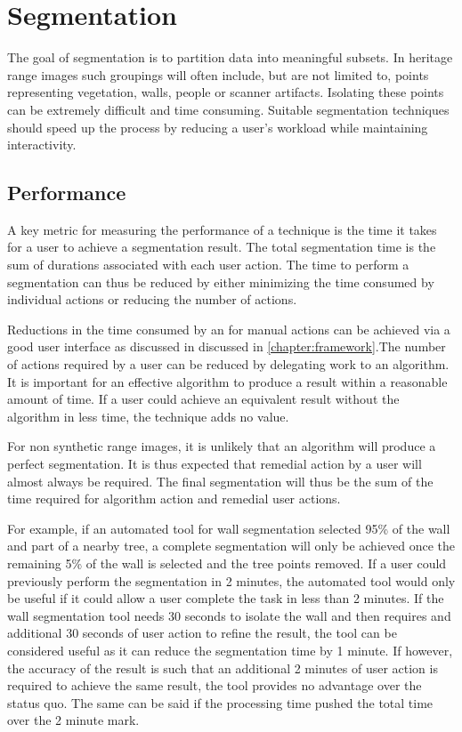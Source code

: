 \chapter{Segmentation}
The goal of segmentation is to partition data into meaningful subsets. In heritage range images such groupings will often include, but are not limited to, points representing vegetation, walls, people or scanner artifacts. Isolating these points can be extremely difficult and time consuming. Suitable segmentation techniques should speed up the process by reducing a user's workload while maintaining interactivity.


\section{Performance}
A key metric for measuring the performance of a technique is the time it takes for a user to achieve a segmentation result. The total segmentation time is the sum of durations associated with each user action. The time to perform a segmentation can thus be reduced by either minimizing the time consumed by individual actions or reducing the number of actions.

Reductions in the time consumed by an for manual actions can be achieved via a good user interface as discussed in discussed in \ref{chapter:framework}.The number of actions required by a user can be reduced by delegating work to an algorithm. It is important for an effective algorithm to produce a result within a reasonable amount of time. If a user could achieve an equivalent result without the algorithm in less time, the technique adds no value.

For non synthetic range images, it is unlikely that an algorithm will produce a perfect segmentation. It is thus expected that remedial action by a user will almost always be required. The final segmentation will thus be the sum of the time required for algorithm action and remedial user actions.

For example, if an automated tool for wall segmentation selected 95\% of the wall and part of a nearby tree, a complete segmentation will only be achieved once the remaining 5\% of the wall is selected and the tree points removed. If a user could previously perform the segmentation in 2 minutes, the automated tool would only be useful if it could allow a user complete the task in less than 2 minutes. If the wall segmentation tool needs 30 seconds to isolate the wall and then requires and additional 30 seconds of user action to refine the result, the tool can be considered useful as it can reduce the segmentation time by 1 minute. If however, the accuracy of the result is such that an additional 2 minutes of user action is required to achieve the same result, the tool provides no advantage over the status quo. The same can be said if the processing time pushed the total time over the 2 minute mark.

